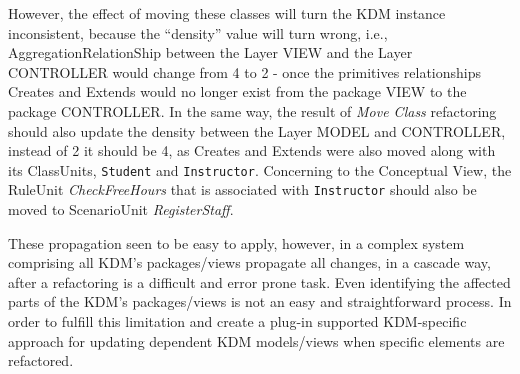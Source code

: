 %
However, the effect of moving these classes will turn the KDM instance inconsistent, because the ``density'' value will turn wrong, i.e., AggregationRelationShip between
the Layer VIEW and the Layer CONTROLLER would
change from 4 to 2 - once the primitives relationships Creates
and Extends would no longer exist from the package VIEW
to the package CONTROLLER. In the same way, the result of \textit{Move Class} refactoring should also update the density between the Layer
MODEL and CONTROLLER, instead of 2 it should be 4, as
Creates and Extends were also moved along with its
ClassUnits, \texttt{Student} and \texttt{Instructor}. Concerning to the
Conceptual View, the RuleUnit \textit{CheckFreeHours} that is associated with
\texttt{Instructor} should also be moved to ScenarioUnit \textit{RegisterStaff}.

These propagation seen to be easy to apply, however, in a complex system comprising all KDM's packages/views propagate all changes, in a cascade way, after a refactoring is a difficult and error prone task. Even identifying the affected parts of the KDM's packages/views is not an easy and straightforward process. In order to fulfill this limitation and create a plug-in supported KDM-specific approach for updating dependent KDM models/views when specific elements are refactored.









